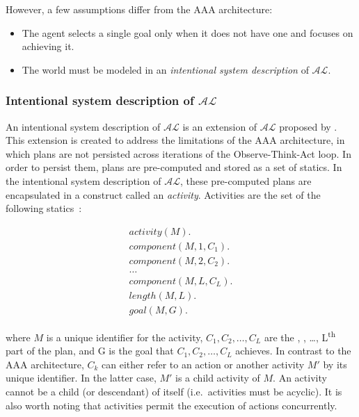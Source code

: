 However, a few assumptions differ from the AAA architecture:

\begin{itemize}
    \item The agent selects a single goal only when it does not have one and focuses on achieving it.
    \item The world must be modeled in an \textit{intentional system description} of $\mathcal{AL}$.
\end{itemize}

\subsubsection{Intentional system description of $\mathcal{AL}$}
\label{subsubsec:intentional_action_language_al}

An intentional system description of $ \mathcal{AL} $ is an extension of $ \mathcal{AL} $ proposed by \citet{blount_architecture_2013}.
This extension is created to address the limitations of the AAA architecture, in which plans are not persisted across iterations of the Observe-Think-Act loop.
In order to persist them, plans are pre-computed and stored as a set of statics.
In the intentional system description of $\mathcal{AL}$, these pre-computed plans are encapsulated in a construct called an \textit{activity}.
Activities are the set of the following statics~\citep{blount_architecture_2013, blount_towards_2014}:

\begin{gather*}
    activity(M). \\
    component(M, 1, C_1). \\
    component(M, 2, C_2). \\
    \dots \\
    component(M, L, C_L). \\
    length(M, L). \\
    goal(M, G).
\end{gather*}

\noindent
where $M$ is a unique identifier for the activity, $C_1, C_2, \dots, C_L$ are the , , \dots, L\textsuperscript{th} part of the plan, and G is the goal that $C_1,C_2,\dots,C_L$ achieves.
In contrast to the AAA architecture, $C_k$ can either refer to an action or another activity $M'$ by its unique identifier.
In the latter case, $M'$ is a child activity of $M$.
An activity cannot be a child (or descendant) of itself (i.e.~activities must be acyclic).
It is also worth noting that activities permit the execution of actions concurrently.

